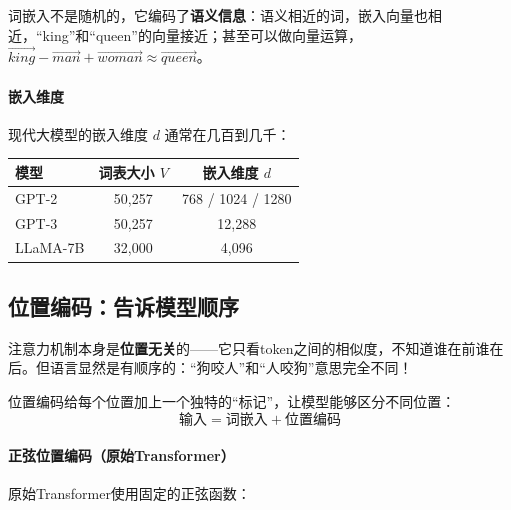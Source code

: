 词嵌入不是随机的，它编码了\textbf{语义信息}：语义相近的词，嵌入向量也相近，“king”和“queen”的向量接近；甚至可以做向量运算，$\vec{king} - \vec{man} + \vec{woman} \approx \vec{queen}$。

\paragraph{嵌入维度}

现代大模型的嵌入维度 $d$ 通常在几百到几千：

\begin{center}
\begin{tabular}{lcc}
\toprule
模型 & 词表大小 $V$ & 嵌入维度 $d$ \\
\midrule
GPT-2 & 50,257 & 768 / 1024 / 1280 \\
GPT-3 & 50,257 & 12,288 \\
LLaMA-7B & 32,000 & 4,096 \\
\bottomrule
\end{tabular}
\end{center}

\subsection{位置编码：告诉模型顺序}

注意力机制本身是\textbf{位置无关}的——它只看token之间的相似度，不知道谁在前谁在后。但语言显然是有顺序的：“狗咬人”和“人咬狗”意思完全不同！

\begin{keyidea}
位置编码给每个位置加上一个独特的“标记”，让模型能够区分不同位置：
\begin{equation}
    \text{输入} = \text{词嵌入} + \text{位置编码}
\end{equation}
\end{keyidea}


\paragraph{正弦位置编码（原始Transformer）}

原始Transformer使用固定的正弦函数：

